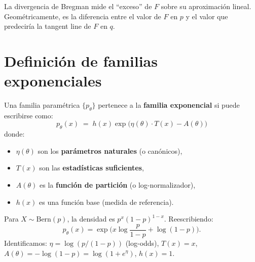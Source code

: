 La divergencia de Bregman mide el ``exceso'' de $F$ sobre su aproximación lineal.  Geométricamente, es la diferencia entre el valor de $F$ en $p$ y el valor que predeciría la tangent line de $F$ en $q$.

\begin{center}
\end{center}

\section{Definición de familias exponenciales}

\begin{definition}
	Una familia paramétrica $\{p_\theta\}$ pertenece a la \textbf{familia exponencial} si puede escribirse como:
	\[
	p_\theta(x) \;=\; h(x) \exp\!\Big(\eta(\theta) \cdot T(x) - A(\theta)\Big)
	\]
	donde:
	\begin{itemize}
		\item $\eta(\theta)$ son los \textbf{parámetros naturales} (o canónicos),
		\item $T(x)$ son las \textbf{estadísticas suficientes},
		\item $A(\theta)$ es la \textbf{función de partición} (o log-normalizador),
		\item $h(x)$ es una función base (medida de referencia).
	\end{itemize}
\end{definition}

\begin{example}
	Para $X \sim \mathrm{Bern}(p)$, la densidad es $p^x(1-p)^{1-x}$.  Reescribiendo:
	\[
	p_\theta(x) = \exp\!\Big(x \log\frac{p}{1-p} + \log(1-p)\Big).
	\]
	Identificamos: $\eta = \log(p/(1-p))$ (log-odds), $T(x) = x$, $A(\theta) = -\log(1-p) = \log(1+e^\eta)$, $h(x) = 1$.
\end{example}

